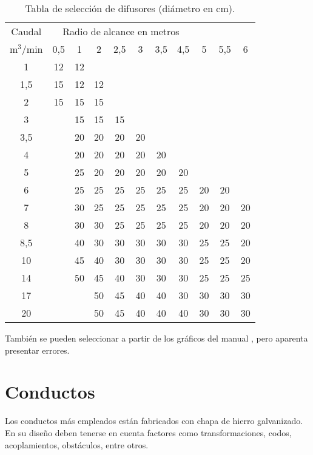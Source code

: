 \begin{table}[H]
	\centering
	\caption{Tabla de selección de difusores (diámetro en cm).}\label{tab:difusores}
	\begin{tabular}{c|cccccccccc}
		\hline
		Caudal & \multicolumn{7}{c}{Radio de alcance en metros} \\
		m$^3$/min & 0,5 & 1 & 2 & 2,5 & 3 & 3,5 & 4,5 & 5 & 5,5 & 6 \\
		\hline
		1    & 12 & 12 &    &     &     &     &     &     &    &    \\
		1,5  & 15 & 12 & 12 &     &     &     &     &     &    &    \\
		2    & 15 & 15 & 15 &     &     &     &     &     &    &    \\
		3    &    & 15 & 15 & 15  &     &     &     &     &    &    \\
		3,5  &    & 20 & 20  & 20  & 20  &     &     &    &     &    \\
		4    &    & 20 & 20  & 20  & 20  & 20  &     &    &     &    \\
		5    &    & 25 & 20  & 20  & 20  & 20  & 20  &    &     &    \\
		6    &    & 25 & 25  & 25  & 25  & 25  & 25  & 20 & 20  &    \\
		7    &    & 30 & 25  & 25  & 25  & 25  & 25  & 20 & 20  & 20 \\
		8    &    & 30 & 30  & 25  & 25  & 25  & 25  & 20 & 20  & 20 \\
		8,5  &    & 40 & 30  & 30  & 30  & 30  & 30  & 25 & 25  & 20 \\
		10   &    & 45 & 40  & 30  & 30  & 30  & 30  & 25 & 25  & 20 \\
		14   &    & 50 & 45  & 40  & 30  & 30  & 30  & 25 & 25  & 25 \\
		17   &    &    & 50  & 45  & 40  & 40  & 30  & 30 & 30  & 30 \\
		20   &    &    & 50  & 45  & 40  & 40  & 40  & 30 & 30  & 30 \\
		\hline
	\end{tabular}
\end{table}

También se pueden seleccionar a partir de los gráficos del manual \parencite[pág. 207 y 208]{quadri2007manual}, pero aparenta presentar errores.
\section{Conductos}

Los conductos más empleados están fabricados con chapa de hierro galvanizado. En su diseño deben tenerse en cuenta factores como transformaciones, codos, acoplamientos, obstáculos, entre otros.

